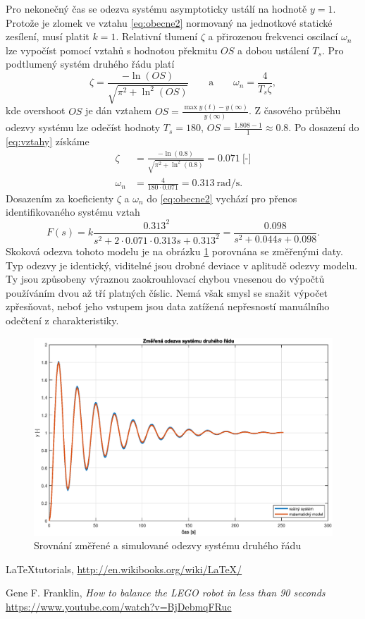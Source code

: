 \documentclass[twoside]{article}
\begin{document}
Pro nekonečný čas se odezva systému asymptoticky ustálí na hodnotě $y = 1$. Protože je zlomek ve vztahu \eqref{eq:obecne2} normovaný na jednotkové statické zesílení,
musí platit $k = 1$. Relativní tlumení $\zeta$ a přirozenou frekvenci oscilací $\omega_n$ lze vypočíst pomocí vztahů s hodnotou překmitu $OS$ a dobou ustálení $T_s$.
Pro podtlumený systém druhého řádu platí
\begin{equation}
	\zeta = \frac{- \ln(OS)}{\sqrt{\pi^2 + \ln^2(OS)}} ~~~~~~~~~ \text{a} ~~~~~~~~~ \omega_n = \frac{4}{T_s \zeta},
	\label{eq:vztahy}
\end{equation}
kde overshoot $OS$ je dán vztahem $OS = \frac{\max y(t) - y(\infty)}{y(\infty)}$.
Z časového průběhu odezvy systému lze odečíst hodnoty $T_s = 180$, $OS = \frac{1.808 - 1}{1} \approx 0.8$.
Po dosazení do \eqref{eq:vztahy} získáme
\begin{equation}
	\begin{split}
		\zeta &= \frac{- \ln(0.8)}{\sqrt{\pi^2 + \ln^2(0.8)}} = 0.071~\text{[-]}\\
		\omega_n &= \frac{4}{180 \cdot 0.071} = 0.313~\text{rad/s}.
	\end{split}
\end{equation}
Dosazením za koeficienty $\zeta$ a $\omega_n$ do \eqref{eq:obecne2} vychází pro přenos identifikovaného systému vztah
\begin{equation}
	F(s) = k \frac{0.313^2}{s^2 + 2 \cdot 0.071 \cdot 0.313 s + 0.313^2} = \frac{0.098}{s^2 + 0.044s + 0.098}.
\end{equation}
Skoková odezva tohoto modelu je na obrázku \ref{fig:zaver2} porovnána se změřenými daty. Typ odezvy je identický,
viditelné jsou drobné deviace v aplitudě odezvy modelu. Ty jsou způsobeny výraznou zaokrouhlovací chybou vnesenou
do výpočtů používáním dvou až tří platných číslic. Nemá však smysl se snažit výpočet zpřesňovat, neboť jeho vstupem
jsou data zatížená nepřesností manuálního odečtení z charakteristiky.
\begin{figure}[hbtp]
	\centering
	\includegraphics[width=\linewidth]{odezvy2.eps}
	\caption{Srovnání změřené a simulované odezvy systému druhého řádu}
	\label{fig:zaver2}
\end{figure}

\begin{thebibliography}{9}

	\LaTeX tutorials, \url{http://en.wikibooks.org/wiki/LaTeX/}

	Gene F. Franklin, \emph{How to balance the LEGO robot in less than 90 seconds} \url{https://www.youtube.com/watch?v=BjDebmqFRuc}

\end{thebibliography}
\end{document}
